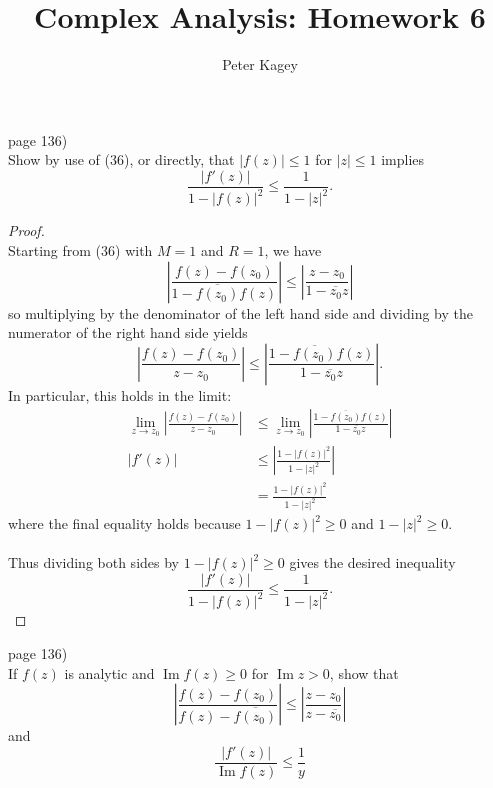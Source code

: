 \documentclass{article}
\newenvironment{problem}[2][Problem]{\begin{trivlist}
\item[\hskip \labelsep {\bfseries #1}\hskip \labelsep {\bfseries #2.}]}{\end{trivlist}}
\begin{document}
\title{Complex Analysis: Homework 6}
\author{Peter Kagey}

\maketitle

\begin{problem}{1} (page 136) \\
  Show by use of (36), or directly, that $|f(z)| \leq 1$ for $|z| \leq 1$
  implies \[
    \frac{|f'(z)|}{1 - |f(z)|^2} \leq \frac{1}{1 - |z|^2}.
  \]
\end{problem}
\begin{proof} \text{} \\
  Starting from (36) with $M = 1$ and $R = 1$, we have \[
    \left| \frac{f(z) - f(z_0)}{1 - \overline{f(z_0)}f(z)} \right| \leq
    \left| \frac{z - z_0}{1 - \overline{z_0}z} \right|
  \] so multiplying by the denominator of the left hand side and dividing by the
  numerator of the right hand side yields \[
  \left| \frac{f(z) - f(z_0)}{z - z_0} \right| \leq
  \left| \frac{1 - \overline{f(z_0)}f(z)}{1 - \overline{z_0}z} \right|.
  \]
  In particular, this holds in the limit: \begin{align*}
    \lim_{z \rightarrow z_0} \left| \frac{f(z) - f(z_0)}{z - z_0} \right| &\leq
    \lim_{z \rightarrow z_0} \left| \frac{1 - \overline{f(z_0)}f(z)}{1 - \overline{z_0}z} \right| \\
    |f'(z)| &\leq \left|\frac{1 - |f(z)|^2}{1 - |z|^2}\right|\\
    &= \frac{1 - |f(z)|^2}{1 - |z|^2}
  \end{align*}
  where the final equality holds because $1 - |f(z)|^2 \geq 0$ and
  $1 - |z|^2 \geq 0$.\\~\\
  Thus dividing both sides by $1 - |f(z)|^2 \geq 0$ gives the desired inequality
  \[
    \frac{|f'(z)|}{1 - |f(z)|^2} \leq \frac{1}{1 - |z|^2}.
  \]
\end{proof}
\pagebreak

\begin{problem}{2} (page 136) \\
  If $f(z)$ is analytic and $\operatorname{Im} f(z) \geq 0$ for
  $\operatorname{Im} z > 0$, show that \[
    \left|\frac{f(z)-f(z_0)}{f(z)-\overline{f(z_0)}}\right| \leq
    \left|\frac{z-z_0}{z - \overline{z_0}}\right|
  \] and \[
    \frac{|f'(z)|}{\operatorname{Im} f(z)} \leq \frac{1}{y}
  \]
\end{problem}
\end{document}
